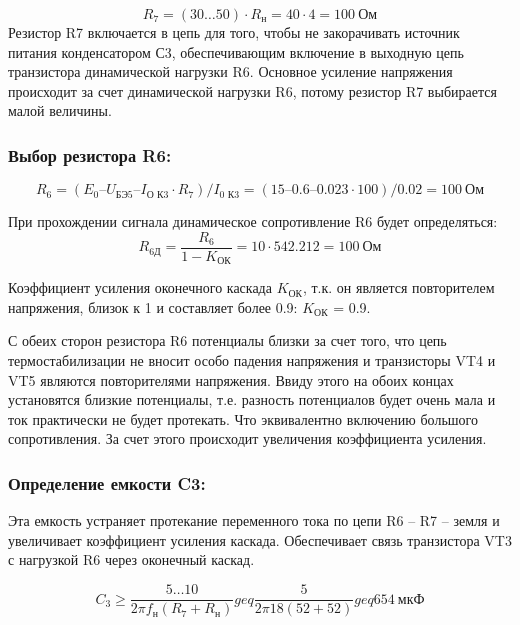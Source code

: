\begin{equation}
\label{eq:equation3_2}
 R_{7} = (30\ldots 50)\cdot R_{н} = 40 \cdot 4 = 100~\text{Ом}
\end{equation}
Резистор R7 включается в цепь для того, чтобы не закорачивать источник питания конденсатором С3, обеспечивающим включение в выходную цепь транзистора динамической нагрузки R6. Основное усиление напряжения происходит за счет динамической нагрузки R6, потому резистор R7 выбирается малой величины.

\subsubsection{Выбор резистора R6:} 
\begin{equation}
\label{eq:equation3_3}
 R_{6} = (E_{0}– U_{\text{БЭ5}} – I_{\text{О К3}} \cdot R_7)/I_{\text{0 К3}} = (15 – 0.6 – 0.023 \cdot 100)/0.02 = 100~\text{Ом}
\end{equation}

При прохождении сигнала динамическое сопротивление R6 будет определяться:
\begin{equation}
\label{eq:equation3_4}
 R_{\text{6Д}} = \dfrac{R_6}{1-K_{\text{ОК}}} = 10 \cdot 542.212 = 100~\text{Ом}
\end{equation}

Коэффициент усиления оконечного каскада $K_{\text{ОК}}$, т.к. он является повторителем напряжения, близок к 1 и составляет более 0.9: $K_{\text{ОК}}$ = 0.9. \par
С обеих сторон резистора R6 потенциалы близки за счет того, что цепь термостабилизации не вносит особо падения напряжения и транзисторы VT4 и VT5 являются повторителями напряжения. Ввиду этого на обоих концах установятся близкие потенциалы, т.е. разность потенциалов будет очень мала и ток практически не будет протекать. Что эквивалентно включению большого сопротивления. За счет этого происходит увеличения коэффициента усиления. \par

\subsubsection{Определение емкости C3:} 
Эта емкость устраняет протекание переменного тока по цепи R6 – R7 – земля и увеличивает коэффициент усиления каскада. Обеспечивает связь транзистора VT3 с нагрузкой R6 через оконечный каскад. \par
\begin{equation}
\label{eq:equation3_5}
 C_3 \geq \dfrac{5 \ldots 10}{2 \pi f_{\text{н}} (R_7 + R_{\text{н}})} geq \dfrac{5}{2 \pi 18 (52 + 52)} geq 654~\text{мкФ}
\end{equation}

